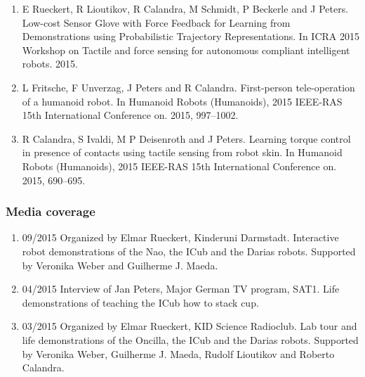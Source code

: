 \begin{enumerate}
\item E Rueckert, R Lioutikov, R Calandra, M Schmidt, P Beckerle and J Peters. Low-cost Sensor Glove with Force Feedback for Learning from Demonstrations using Probabilistic Trajectory Representations. In ICRA 2015 Workshop on Tactile and force sensing for autonomous compliant intelligent robots. 2015.
\item L Fritsche, F Unverzag, J Peters and R Calandra. First-person tele-operation of a humanoid robot. In Humanoid Robots (Humanoids), 2015 IEEE-RAS 15th International Conference on. 2015, 997–1002.
\item R Calandra, S Ivaldi, M P Deisenroth and J Peters. Learning torque control in presence of contacts using tactile sensing from robot skin. In Humanoid Robots (Humanoids), 2015 IEEE-RAS 15th International Conference on. 2015, 690–695.
\end{enumerate}

\subsubsection{Media coverage}%

\begin{enumerate}
\item 09/2015 Organized by Elmar Rueckert, Kinderuni Darmstadt. Interactive robot demonstrations of the Nao, the ICub and the Darias robots. Supported by Veronika Weber and Guilherme J. Maeda.
\item 04/2015 Interview of Jan Peters, Major German TV program, SAT1. Life demonstrations of teaching the ICub how to stack cup.
\item 03/2015 Organized by Elmar Rueckert, KID Science Radioclub. Lab tour and life demonstrations of the Oncilla, the ICub and the Darias robots. Supported by Veronika Weber, Guilherme J. Maeda, Rudolf Lioutikov and Roberto Calandra.

\end{enumerate}

